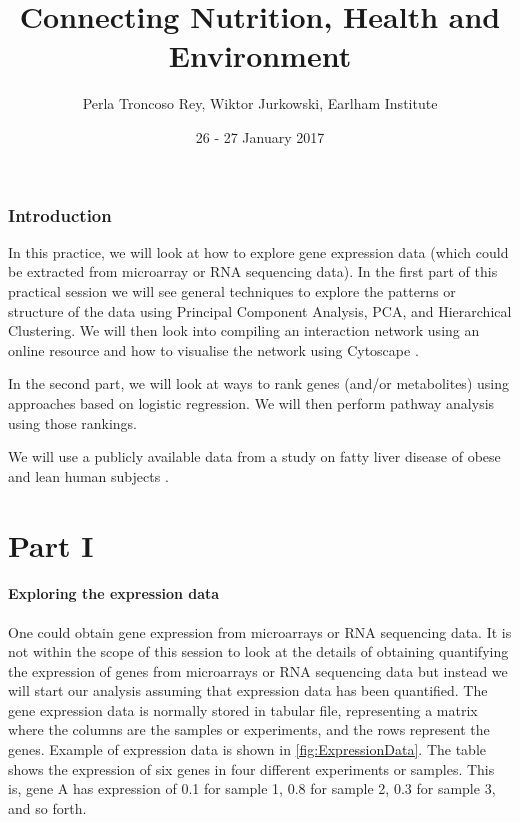 \documentclass[11pt, oneside]{article}   	%
\title{Connecting Nutrition, Health and Environment }
\author{Perla Troncoso Rey, Wiktor Jurkowski, Earlham Institute}
\date{26 - 27 January 2017}	 %
\begin{document}
\maketitle

\tableofcontents

\listoffigures
\listoftables


\section{Introduction}

In this practice, we will look at how to explore  gene expression data (which could be extracted from microarray or RNA sequencing data). In the first part of this practical session we will see general techniques to explore the patterns or structure of the data using Principal Component Analysis, PCA, and Hierarchical Clustering. We will then look into compiling an interaction network using an online resource and how to visualise the network using Cytoscape \cite{}.

In the second part, we will look at ways to rank genes (and/or metabolites) using approaches based on logistic regression. We will then perform pathway analysis using those rankings.

We will use a publicly available data from a study on fatty liver disease of obese and lean human subjects \cite{}.



\part{Part I}

\subsection{Exploring the expression data}

One could obtain gene expression from microarrays or RNA sequencing data. It is not within the scope of this session to look at the details of obtaining quantifying the expression of genes from microarrays or RNA sequencing data but instead we will start our analysis assuming that expression data has been quantified.
The gene expression data is normally stored in tabular file, representing a matrix where the columns are the samples or experiments, and the rows represent the genes. 
Example of expression data is shown in \autoref{fig:ExpressionData}. The table shows the expression of six genes in four different experiments or samples. This is, gene A has expression of 0.1 for sample 1, 0.8 for sample 2, 0.3 for sample 3, and so forth. 
\end{document}
